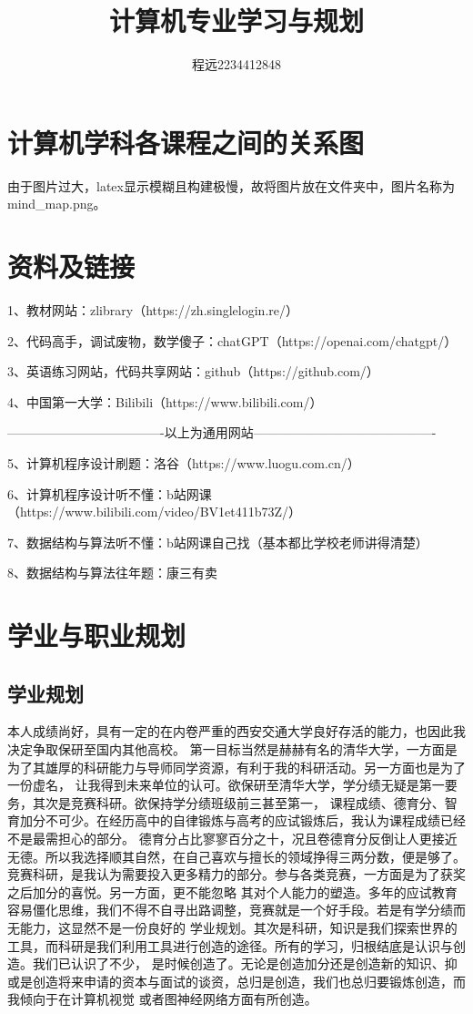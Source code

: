 \documentclass[UTF8]{ctexart}
\begin{document}
\title{\vspace{0cm}计算机专业学习与规划}
\author{程远2234412848}
\date{}
\maketitle
\section{计算机学科各课程之间的关系图}
由于图片过大，latex显示模糊且构建极慢，故将图片放在文件夹中，图片名称为mind\_map.png。
\section{资料及链接}
1、教材网站：zlibrary（https://zh.singlelogin.re/）

2、代码高手，调试废物，数学傻子：chatGPT（https://openai.com/chatgpt/）

3、英语练习网站，代码共享网站：github（https://github.com/）

4、中国第一大学：Bilibili（https://www.bilibili.com/）

-------------------------------------以上为通用网站-------------------------------------------

5、计算机程序设计刷题：洛谷（https://www.luogu.com.cn/）

6、计算机程序设计听不懂：b站网课（https://www.bilibili.com/video/BV1et411b73Z/）

7、数据结构与算法听不懂：b站网课自己找（基本都比学校老师讲得清楚）

8、数据结构与算法往年题：康三有卖

\section{学业与职业规划}
\subsection{学业规划}


本人成绩尚好，具有一定的在内卷严重的西安交通大学良好存活的能力，也因此我决定争取保研至国内其他高校。
第一目标当然是赫赫有名的清华大学，一方面是为了其雄厚的科研能力与导师同学资源，有利于我的科研活动。另一方面也是为了一份虚名，
让我得到未来单位的认可。欲保研至清华大学，学分绩无疑是第一要务，其次是竞赛科研。欲保持学分绩班级前三甚至第一，
课程成绩、德育分、智育加分不可少。在经历高中的自律锻炼与高考的应试锻炼后，我认为课程成绩已经不是最需担心的部分。
德育分占比寥寥百分之十，况且卷德育分反倒让人更接近无德。所以我选择顺其自然，在自己喜欢与擅长的领域挣得三两分数，便是够了。
竞赛科研，是我认为需要投入更多精力的部分。参与各类竞赛，一方面是为了获奖之后加分的喜悦。另一方面，更不能忽略
其对个人能力的塑造。多年的应试教育容易僵化思维，我们不得不自寻出路调整，竞赛就是一个好手段。若是有学分绩而无能力，这显然不是一份良好的
学业规划。其次是科研，知识是我们探索世界的工具，而科研是我们利用工具进行创造的途径。所有的学习，归根结底是认识与创造。我们已认识了不少，
是时候创造了。无论是创造加分还是创造新的知识、抑或是创造将来申请的资本与面试的谈资，总归是创造，我们也总归要锻炼创造，而我倾向于在计算机视觉
或者图神经网络方面有所创造。
\end{document}
